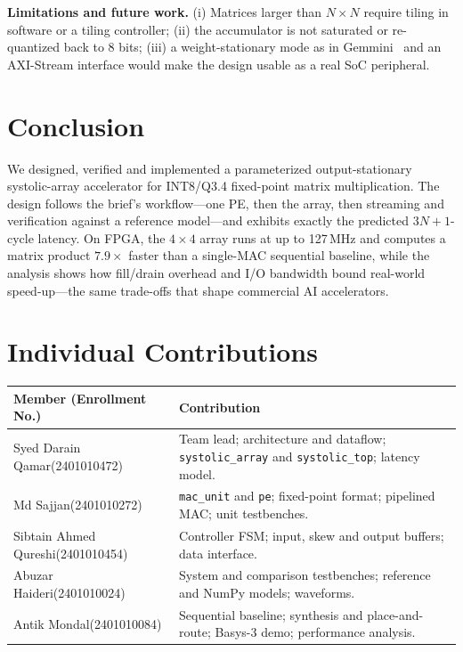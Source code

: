 \documentclass[conference]{IEEEtran}
\begin{document}
\textbf{Limitations and future work.} (i) Matrices larger than $N\times N$
require tiling in software or a tiling controller; (ii) the accumulator is not
saturated or re-quantized back to 8 bits; (iii) a weight-stationary mode as
in Gemmini~\cite{genc2021gemmini} and an AXI-Stream interface would make the
design usable as a real SoC peripheral.

\section{Conclusion}
We designed, verified and implemented a parameterized output-stationary
systolic-array accelerator for INT8/Q3.4 fixed-point matrix multiplication.
The design follows the brief's workflow---one PE, then the array, then
streaming and verification against a reference model---and exhibits exactly
the predicted $3N+1$-cycle latency. On FPGA, the $4\times4$ array runs at
up to 127\,MHz and computes a matrix product $7.9\times$ faster than a
single-MAC sequential baseline, while the analysis shows how fill/drain
overhead and I/O bandwidth bound real-world speed-up---the same trade-offs
that shape commercial AI accelerators.

\section*{Individual Contributions}
{\small
\begin{tabular}{@{}>{\raggedright\arraybackslash}p{}>{\raggedright\arraybackslash}p{}@{}}
\toprule
Member (Enrollment No.) & Contribution\\
\midrule
Syed Darain Qamar\newline(2401010472) & Team lead; architecture and dataflow; \texttt{systolic\_array} and \texttt{systolic\_top}; latency model.\\
Md Sajjan\newline(2401010272) & \texttt{mac\_unit} and \texttt{pe}; fixed-point format; pipelined MAC; unit testbenches.\\
Sibtain Ahmed Qureshi\newline(2401010454) & Controller FSM; input, skew and output buffers; data interface.\\
Abuzar Haideri\newline(2401010024) & System and comparison testbenches; reference and NumPy models; waveforms.\\
Antik Mondal\newline(2401010084) & Sequential baseline; synthesis and place-and-route; Basys-3 demo; performance analysis.\\
\bottomrule
\end{tabular}}
\end{document}
